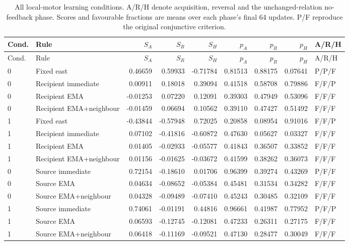 \begingroup\scriptsize\setlength{\tabcolsep}{3pt}\setlength{\LTpre}{6pt}\setlength{\LTpost}{6pt}
\begin{longtable}{llrrrrrrl}
\caption{All local-motor learning conditions. A/R/H denote acquisition, reversal and the unchanged-relation no-feedback phase. Scores and favourable fractions are means over each phase's final 64 updates. P/F reproduce the original conjunctive criterion.}\label{tab:motor-phases}\\
\toprule
Cond. & Rule & $S_A$ & $S_R$ & $S_H$ & $p_A$ & $p_R$ & $p_H$ & A/R/H \\
\midrule
\endfirsthead
\toprule
Cond. & Rule & $S_A$ & $S_R$ & $S_H$ & $p_A$ & $p_R$ & $p_H$ & A/R/H \\
\midrule
\endhead
0 & Fixed east & 0.46659 & 0.59933 & -0.71784 & 0.81513 & 0.88175 & 0.07641 & P/P/F \\
0 & Recipient immediate & 0.00911 & 0.18018 & 0.39094 & 0.41518 & 0.58708 & 0.79886 & F/F/P \\
0 & Recipient EMA & -0.01253 & 0.07220 & 0.12091 & 0.39303 & 0.47949 & 0.53096 & F/F/F \\
0 & Recipient EMA+neighbour & -0.01459 & 0.06694 & 0.10562 & 0.39110 & 0.47427 & 0.51492 & F/F/F \\
1 & Fixed east & -0.43844 & -0.57948 & 0.72025 & 0.20858 & 0.08954 & 0.91016 & F/F/P \\
1 & Recipient immediate & 0.07102 & -0.41816 & -0.60872 & 0.47630 & 0.05627 & 0.03327 & F/F/F \\
1 & Recipient EMA & 0.01405 & -0.02933 & -0.05577 & 0.41843 & 0.36507 & 0.33852 & F/F/F \\
1 & Recipient EMA+neighbour & 0.01156 & -0.01625 & -0.03672 & 0.41599 & 0.38262 & 0.36073 & F/F/F \\
0 & Source immediate & 0.72154 & -0.18610 & 0.01706 & 0.96399 & 0.39274 & 0.43269 & P/F/F \\
0 & Source EMA & 0.04634 & -0.08652 & -0.05384 & 0.45481 & 0.31534 & 0.34282 & F/F/F \\
0 & Source EMA+neighbour & 0.04328 & -0.09489 & -0.07410 & 0.45243 & 0.30485 & 0.32109 & F/F/F \\
1 & Source immediate & 0.74061 & -0.01191 & 0.44816 & 0.96661 & 0.41987 & 0.77952 & P/F/P \\
1 & Source EMA & 0.06593 & -0.12745 & -0.12081 & 0.47233 & 0.26311 & 0.27175 & F/F/F \\
1 & Source EMA+neighbour & 0.06418 & -0.11169 & -0.09521 & 0.47130 & 0.28477 & 0.30049 & F/F/F \\
\bottomrule
\end{longtable}
